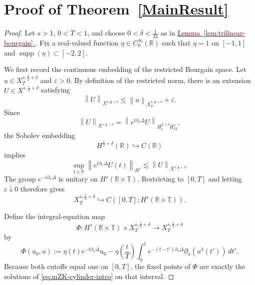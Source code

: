 \documentclass[12pt,oneside,reqno]{amsart}
\newcommand{\lemref}[1]{%
    \hyperref[#1]{%
        \textcolor{Maroon}{Lemma~\ref*{#1}}%
    }%
}
\numberwithin{equation}{section}
\theoremstyle{plain}
\def\R{{\mathbb R}}
\def\T{{\mathbb T}}
\newcommand{\supp}{\operatorname{supp}}
\newcommand{\norm}[1]{%
    \left\lVert #1\right\rVert%
}
\newcommand{\prc}[1]{%
    \left(#1\right)
}
\def\pt{\partial}
\newcommand{\xnorm}[3]{%
    \left\lVert #1\right\rVert_{X^{{#2},{#3}}}%
}
\newcommand{\xtnorm}[3]{%
    \left\lVert #1\right\rVert_{X^{{#2},{#3}}_T}%
}
\newcommand{\rt}{\R\times\T}
\begin{document}
\section{Proof of Theorem~\ref{MainResult}}
\begin{proof}
Let $s>1$, $0<T<1$, and choose $0<\delta<\frac1{24}$ as in
\lemref{lem:trilinear-bourgain}. Fix a real-valued function
$\eta\in C_0^\infty(\R)$ such that $\eta=1$ on $[-1,1]$ and
$\supp(\eta)\subset[-2,2]$.

We first record the continuous embedding of the restricted Bourgain space.
Let $u\in X_T^{s,\frac12+\delta}$ and $\varepsilon>0$. By definition of the
restricted norm, there is an extension $U\in X^{s,\frac12+\delta}$ satisfying
\begin{equation}
    \xnorm{U}{s}{\frac12+\delta}
    \leq
    \xtnorm{u}{s}{\frac12+\delta}+\varepsilon.
\end{equation}
Since
\begin{equation}
    \xnorm{U}{s}{\frac12+\delta}
    =
    \norm{
        e^{t\pt_x\Delta}U
    }_{H_t^{\frac12+\delta}H_{xy}^s},
\end{equation}
the Sobolev embedding
\begin{equation}
    H^{\frac12+\delta}(\R)
    \hookrightarrow
    C(\R)
\end{equation}
implies
\begin{equation}
    \sup_{t\in\R}
    \norm{
        e^{t\pt_x\Delta}U(t)
    }_{H^s}
    \lesssim
    \xnorm{U}{s}{\frac12+\delta}.
\end{equation}
The group $e^{-t\pt_x\Delta}$ is unitary on $H^s(\rt)$. Restricting to
$[0,T]$ and letting $\varepsilon\downarrow0$ therefore gives
\begin{equation}
    X_T^{s,\frac12+\delta}
    \hookrightarrow
    C\prc{[0,T];H^s(\rt)}.
\end{equation}

Define the integral-equation map
\begin{equation*}
    \Phi:
    H^s(\rt)\times X_T^{s,\frac12+\delta}
    \longrightarrow
    X_T^{s,\frac12+\delta}
\end{equation*}
by
\begin{equation}
\label{IntegralEquation}
\Phi(u_0,u)
:=
\eta(t)e^{-t\pt_x\Delta}u_0
-
\eta\prc{\frac{t}{T}}
\int_0^t
e^{-(t-t')\pt_x\Delta}
\pt_x\prc{u^3(t')}
\,dt'.
\end{equation}
Because both cutoffs equal one on $[0,T]$, the fixed points of $\Phi$ are
exactly the solutions of \eqref{eq:mZK-cylinder-intro} on that interval.


\end{proof}
\end{document}
